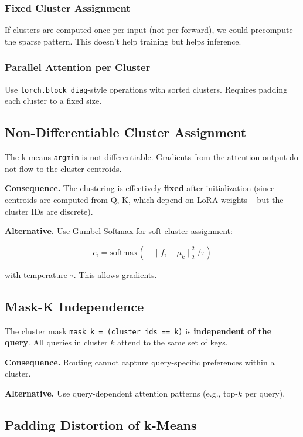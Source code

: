 \subsubsection{Fixed Cluster Assignment}

If clusters are computed once per input (not per forward), we could 
precompute the sparse pattern. This doesn't help training but helps inference.

\subsubsection{Parallel Attention per Cluster}

Use \texttt{torch.block\_diag}-style operations with sorted clusters. Requires 
padding each cluster to a fixed size.

\subsection{Non-Differentiable Cluster Assignment}

The k-means \texttt{argmin} is not differentiable. Gradients from the attention 
output do not flow to the cluster centroids.

\textbf{Consequence.} The clustering is effectively \textbf{fixed} after initialization 
(since centroids are computed from Q, K, which depend on LoRA weights -- 
but the cluster IDs are discrete).

\textbf{Alternative.} Use Gumbel-Softmax for soft cluster assignment:

\[
c_i = \text{softmax}(-\|f_i - \mu_k\|_2^2 / \tau)
\tag{8.1}
\]

with temperature $\tau$. This allows gradients.

\subsection{Mask-K Independence}

The cluster mask \texttt{mask\_k = (cluster\_ids == k)} is \textbf{independent of the query}. 
All queries in cluster $k$ attend to the same set of keys.

\textbf{Consequence.} Routing cannot capture query-specific preferences within a 
cluster.

\textbf{Alternative.} Use query-dependent attention patterns (e.g., top-$k$ per 
query).

\subsection{Padding Distortion of k-Means}

